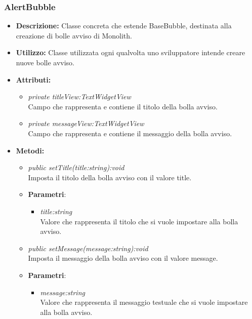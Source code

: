 \subsubsection{AlertBubble}
\begin{itemize}
\item \textbf{Descrizione:} Classe concreta che estende BaseBubble, destinata alla creazione di bolle avviso di Monolith.
\item \textbf{Utilizzo:} Classe utilizzata ogni qualvolta uno sviluppatore intende creare nuove bolle avviso.
\item \textbf{Attributi:} 
\begin{itemize}
\item \textit{private titleView:TextWidgetView}\\
Campo che rappresenta e contiene il titolo della bolla avviso.
\item \textit{private messageView:TextWidgetView}\\
Campo che rappresenta e contiene il messaggio della bolla avviso.
\end{itemize}
\item \textbf{Metodi:}
\begin{itemize}
\item \textit{public setTitle(title:string):void}\\
Imposta il titolo della bolla avviso con il valore title.
\item{\textbf{Parametri}: \begin{itemize}
\item \textit{title:string}\\
Valore che rappresenta il titolo che si vuole impostare alla bolla avviso.
\end{itemize}}
\item \textit{public setMessage(message:string):void}\\
Imposta il messaggio della bolla avviso con il valore message.
\item{\textbf{Parametri}: \begin{itemize}
\item \textit{message:string}\\
Valore che rappresenta il messaggio testuale che si vuole impostare alla bolla avviso.
\end{itemize}}
\end{itemize}
\end{itemize}